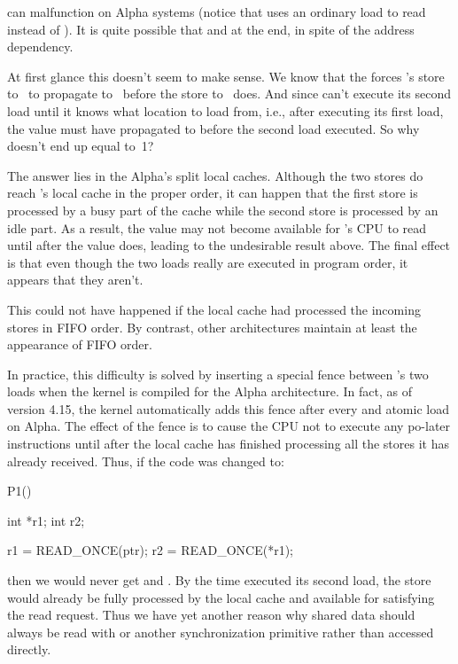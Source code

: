 \noindent%
can malfunction on Alpha systems (notice that  uses an ordinary load
to read  instead of ).
It is quite possible that  and  at the end,
in spite of the address dependency.

At first glance this doesn't seem to make sense.
We know that the  forces 's store to~ to
propagate to~ before the store to~ does.
And since  can't execute its second load until it knows what
location to load from, i.e., after executing its first load,
the value  must have propagated to  before the
second load executed.
So why doesn't  end up equal to~1?

The answer lies in the Alpha's split local caches.
Although the two stores do reach 's local cache in the
proper order, it can happen that the first store is processed by a
busy part of the cache while the second store is processed by an
idle part.
As a result, the  value may not become available for
's CPU to read until after the  value does,
leading to the undesirable result above.
The final effect is that even though the two loads really are
executed in program order, it appears that they aren't.

This could not have happened if the local cache had processed the
incoming stores in FIFO order.
By contrast, other architectures maintain at least the appearance of
FIFO order.

In practice, this difficulty is solved by inserting a special fence
between 's two loads when the kernel is compiled for the Alpha
architecture.
In fact, as of version 4.15, the kernel automatically adds this fence
after every  and atomic load on Alpha.
The effect of the fence is to cause the CPU not to execute any po-later
instructions until after the local cache has finished processing all
the stores it has already received.
Thus, if the code was changed to:

\begin{VerbatimU}
	P1()
	{
		int *r1;
		int r2;

		r1 = READ_ONCE(ptr);
		r2 = READ_ONCE(*r1);
	}
\end{VerbatimU}

\noindent%
then we would never get  and .
By the time  executed its second load, the  store
would already be fully processed by the local cache and available for
satisfying the read request.
Thus we have yet another reason why shared data should always be read
with  or another synchronization primitive rather than
accessed directly.

